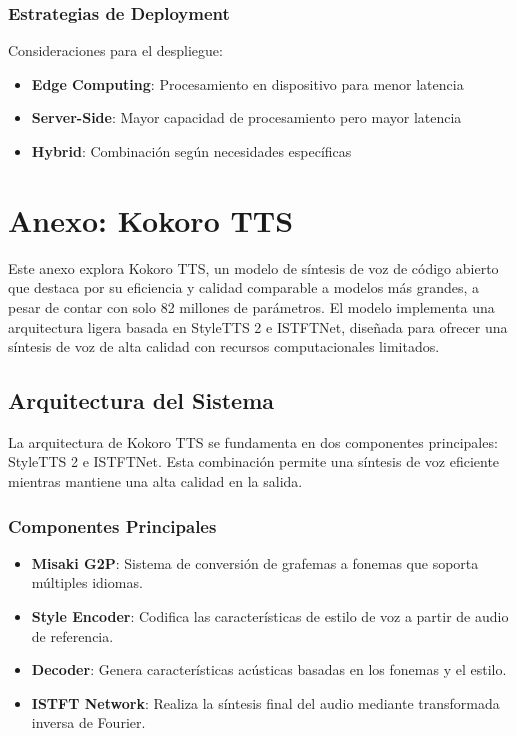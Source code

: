 \subsection{Estrategias de Deployment}
Consideraciones para el despliegue:

\begin{itemize}
	\item \textbf{Edge Computing}: Procesamiento en dispositivo para menor latencia
	\item \textbf{Server-Side}: Mayor capacidad de procesamiento pero mayor latencia
	\item \textbf{Hybrid}: Combinación según necesidades específicas
\end{itemize}

\chapter{Anexo: Kokoro TTS}
\label{anexo-kokoro}

Este anexo explora Kokoro TTS, un modelo de síntesis de voz de código abierto que destaca por su eficiencia y calidad comparable a modelos más grandes, a pesar de contar con solo 82 millones de parámetros. El modelo implementa una arquitectura ligera basada en StyleTTS 2 e ISTFTNet, diseñada para ofrecer una síntesis de voz de alta calidad con recursos computacionales limitados.

\section{Arquitectura del Sistema}
\label{sec:kokoro-architecture}

La arquitectura de Kokoro TTS se fundamenta en dos componentes principales: StyleTTS 2 e ISTFTNet. Esta combinación permite una síntesis de voz eficiente mientras mantiene una alta calidad en la salida.

\subsection{Componentes Principales}
\label{subsec:main-components}

\begin{itemize}
	\item \textbf{Misaki G2P}: Sistema de conversión de grafemas a fonemas que soporta múltiples idiomas.
	\item \textbf{Style Encoder}: Codifica las características de estilo de voz a partir de audio de referencia.
	\item \textbf{Decoder}: Genera características acústicas basadas en los fonemas y el estilo.
	\item \textbf{ISTFT Network}: Realiza la síntesis final del audio mediante transformada inversa de Fourier.
\end{itemize}

